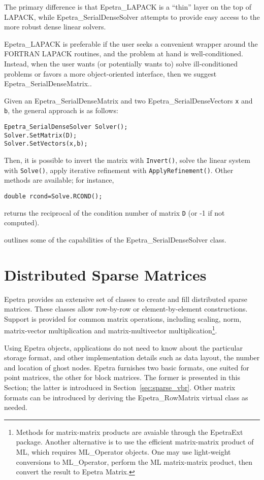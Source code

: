 The primary difference is that Epetra\_LAPACK is a ``thin'' layer on the
top of LAPACK, while Epetra\_SerialDenseSolver attempts to provide easy
access to the more robust dense linear solvers.

Epetra\_LAPACK is preferable if the user seeks a convenient wrapper
around the FORTRAN LAPACK routines, and the problem at hand is
well-conditioned. Instead, when the user wants (or potentially wants to)
solve ill-conditioned problems or favors a more object-oriented
interface, then we suggest Epetra\_SerialDenseMatrix..

\smallskip

Given an Epetra\_SerialDenseMatrix and two Epetra\_SerialDenseVectors
{\tt x} and {\tt b}, the general approach is as follows:
\begin{verbatim}
Epetra_SerialDenseSolver Solver();
Solver.SetMatrix(D);
Solver.SetVectors(x,b);
\end{verbatim}
Then, it is possible to invert the matrix with \verb!Invert()!, solve
the linear system with \verb!Solve()!, apply iterative refinement with
\verb!ApplyRefinement()!. Other methods are available; for instance,
\begin{verbatim}
double rcond=Solve.RCOND();
\end{verbatim}
returns the reciprocal of the condition number of matrix {\tt D} (or -1
if not computed).

 outlines some of the capabilities of the
Epetra\_SerialDenseSolver class.


\section{Distributed Sparse Matrices}
\label{sec:sparse_mat}

Epetra provides an extensive set of classes to create and fill
distributed sparse matrices. These classes allow row-by-row or
element-by-element constructions. Support is provided for common matrix
operations, including scaling, norm, matrix-vector multiplication and
matrix-multivector multiplication\footnote{Methods for matrix-matrix
  products are avaiable through the EpetraExt package. Another
  alternative is to use the efficient matrix-matrix product of ML, which
  requires ML\_Operator objects. One may use light-weight conversions to
  ML\_Operator, perform the ML matrix-matrix product, then convert the
  result to Epetra Matrix.}.

Using Epetra objects, applications do not need to know about the
particular storage format, and other implementation details such as data
layout, the number and location of ghost nodes. Epetra furnishes two
basic formats, one suited for point matrices, the other for block
matrices.  The former is presented in this Section; the latter is
introduced in Section~\ref{sec:sparse_vbr}. Other matrix formats can be
introduced by deriving the Epetra\_RowMatrix virtual class as needed.

